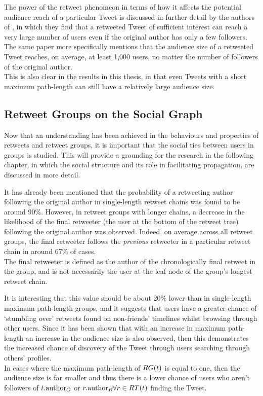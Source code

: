 The power of the retweet phenomeon in terms of how it affects the potential audience reach of a particular Tweet is discussed in further detail by the authors of \cite{kwak10}, in which they find that a retweeted Tweet of sufficient interest can reach a very large number of users even if the original author has only a few followers. The same paper more specifically mentions that the audience size of a retweeted Tweet reaches, on average, at least 1,000 users, no matter the number of followers of the original author.\\
This is also clear in the results in this thesis, in that even Tweets with a short maximum path-length can still have a relatively large audience size.


\subsection{Retweet Groups on the Social Graph}
Now that an understanding has been achieved in the behaviours and properties of retweets and retweet groups, it is important that the social ties between users in groups is studied. This will provide a grounding for the research in the following chapter, in which the social structure and its role in facilitating propagation, are discussed in more detail.

It has already been mentioned that the probability of a retweeting author following the original author in single-length retweet chains was found to be around 90\%. However, in retweet groups with longer chains, a decrease in the likelihood of the final retweeter (the user at the bottom of the retweet tree) following the original author was observed. Indeed, on average across all retweet groups, the final retweeter follows the \textit{previous} retweeter in a particular retweet chain in around 67\% of cases.\\
The final retweeter is defined as the author of the chronologically final retweet in the group, and is not necessarily the user at the leaf node of the group's longest retweet chain.


It is interesting that this value should be about 20\% lower than in single-length maximum path-length groups, and it suggests that users have a greater chance of `stumbling over' retweets found on non-friends' timelines whilst browsing through other users. Since it has been shown that with an increase in maximum path-length an increase in the audience size is also observed, then this demonstrates the increased chance of discovery of the Tweet through users searching through others' profiles.\\
In cases where the maximum path-length of $RG(t)$ is equal to one, then the audience size is far smaller and thus there is a lower chance of users who aren't followers of $t.\textrm{author}_O$ or $r.\textrm{author}_R \forall r \in RT(t)$ finding the Tweet.


